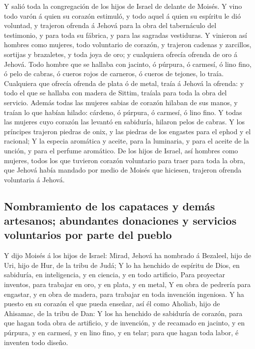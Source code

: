  Y salió toda la congregación de los hijos de Israel de
delante de Moisés.  Y vino todo varón á quien su corazón
estimuló, y todo aquel á quien su espíritu le dió voluntad, y trajeron
ofrenda á Jehová para la obra del tabernáculo del testimonio, y para
toda su fábrica, y para las sagradas vestiduras.  Y
vinieron así hombres como mujeres, todo voluntario de corazón, y
trajeron cadenas y zarcillos, sortijas y brazaletes, y toda joya de oro;
y cualquiera ofrecía ofrenda de oro á Jehová.  Todo
hombre que se hallaba con jacinto, ó púrpura, ó carmesí, ó lino fino, ó
pelo de cabras, ó cueros rojos de carneros, ó cueros de tejones, lo
traía.  Cualquiera que ofrecía ofrenda de plata ó de
metal, traía á Jehová la ofrenda: y todo el que se hallaba con madera de
Sittim, traíala para toda la obra del servicio.  Además
todas las mujeres sabias de corazón hilaban de sus manos, y traían lo
que habían hilado: cárdeno, ó púrpura, ó carmesí, ó lino fino.
 Y todas las mujeres cuyo corazón las levantó en
sabiduría, hilaron pelos de cabras.  Y los príncipes
trajeron piedras de onix, y las piedras de los engastes para el ephod y
el racional;  Y la especia aromática y aceite, para la
luminaria, y para el aceite de la unción, y para el perfume aromático.
 De los hijos de Israel, así hombres como mujeres, todos
los que tuvieron corazón voluntario para traer para toda la obra, que
Jehová había mandado por medio de Moisés que hiciesen, trajeron ofrenda
voluntaria á Jehová.

\hypertarget{nombramiento-de-los-capataces-y-demuxe1s-artesanos-abundantes-donaciones-y-servicios-voluntarios-por-parte-del-pueblo}{%
\subsection{Nombramiento de los capataces y demás artesanos; abundantes
donaciones y servicios voluntarios por parte del
pueblo}\label{nombramiento-de-los-capataces-y-demuxe1s-artesanos-abundantes-donaciones-y-servicios-voluntarios-por-parte-del-pueblo}}

 Y dijo Moisés á los hijos de Israel: Mirad, Jehová ha
nombrado á Bezaleel, hijo de Uri, hijo de Hur, de la tribu de Judá;
 Y lo ha henchido de espíritu de Dios, en sabiduría, en
inteligencia, y en ciencia, y en todo artificio,  Para
proyectar inventos, para trabajar en oro, y en plata, y en metal,
 Y en obra de pedrería para engastar, y en obra de
madera, para trabajar en toda invención ingeniosa.  Y ha
puesto en su corazón el que pueda enseñar, así él como Aholiab, hijo de
Ahisamac, de la tribu de Dan:  Y los ha henchido de
sabiduría de corazón, para que hagan toda obra de artificio, y de
invención, y de recamado en jacinto, y en púrpura, y en carmesí, y en
lino fino, y en telar; para que hagan toda labor, é inventen todo
diseño.

